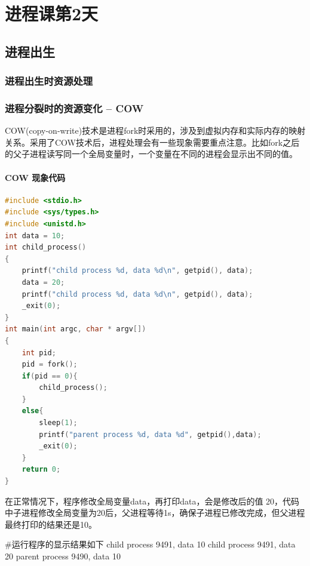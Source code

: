 


\part{进程课第2天}

\chapter{进程出生}
\section{进程出生时资源处理}

\section{进程分裂时的资源变化 -- COW}
COW(copy-on-write)技术是进程fork时采用的，涉及到虚拟内存和实际内存的映射关系。采用了COW技术后，进程处理会有一些现象需要重点注意。比如fork之后的父子进程读写同一个全局变量时，一个变量在不同的进程会显示出不同的值。
\subsection{COW 现象代码}
\begin{lstlisting}[language={C}]
#include <stdio.h>
#include <sys/types.h>
#include <unistd.h>
int data = 10;
int child_process()
{
    printf("child process %d, data %d\n", getpid(), data);
    data = 20;
    printf("child process %d, data %d\n", getpid(), data);
    _exit(0);
}
int main(int argc, char * argv[])
{
    int pid;
    pid = fork();
    if(pid == 0){
        child_process();
    }
    else{
        sleep(1);
        printf("parent process %d, data %d", getpid(),data);
        _exit(0);
    }
    return 0;
}
\end{lstlisting}
在正常情况下，程序修改全局变量data，再打印data，会是修改后的值 20，代码中子进程修改全局变量为20后，父进程等待1s，确保子进程已修改完成，但父进程最终打印的结果还是10。
\begin{latexcmd}[label= COW现象]
#运行程序的显示结果如下
child process 9491, data 10
child process 9491, data 20
parent process 9490, data 10
\end{latexcmd}

